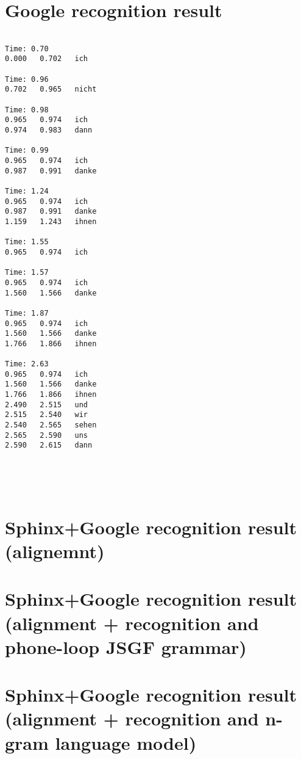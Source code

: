 \section {Google recognition result}
\begin{center}
\begin{lstlisting}[style=nonumbers]

Time: 0.70
0.000	0.702	ich

Time: 0.96
0.702	0.965	nicht

Time: 0.98
0.965	0.974	ich
0.974	0.983	dann

Time: 0.99
0.965	0.974	ich
0.987	0.991	danke

Time: 1.24
0.965	0.974	ich
0.987	0.991	danke
1.159	1.243	ihnen

Time: 1.55
0.965	0.974	ich

Time: 1.57
0.965	0.974	ich
1.560	1.566	danke

Time: 1.87
0.965	0.974	ich
1.560	1.566	danke
1.766	1.866	ihnen

Time: 2.63
0.965	0.974	ich
1.560	1.566	danke
1.766	1.866	ihnen
2.490	2.515	und
2.515	2.540	wir
2.540	2.565	sehen
2.565	2.590	uns
2.590	2.615	dann





\end{lstlisting}
\end{center}

\section {Sphinx+Google recognition result (alignemnt)}
\section {Sphinx+Google recognition result (alignment + recognition and
phone-loop JSGF grammar)}
\section {Sphinx+Google recognition result (alignment + recognition and
n-gram language model)}
